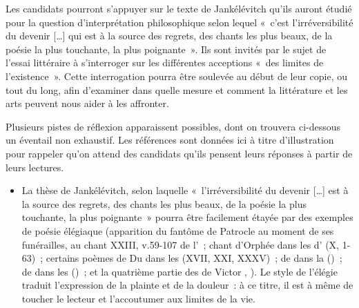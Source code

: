 		{Les candidats pourront s'appuyer sur le texte de Jankélévitch qu'ils auront étudié pour
la question d'interprétation philosophique selon lequel «~c'est l'irréversibilité du devenir
[…] qui est à la source des regrets, des chants les plus beaux, de la poésie la plus
touchante, la plus poignante~». Ils sont invités par le sujet de l'essai littéraire à
s'interroger sur les différentes acceptions «~des limites de l'existence~». Cette
interrogation pourra être soulevée au début de leur copie, ou tout du long, afin
d'examiner dans quelle mesure et comment la littérature et les arts peuvent nous aider
à les affronter.

Plusieurs pistes de réflexion apparaissent possibles, dont on trouvera ci-dessous un
éventail non exhaustif. Les références sont données ici à titre d'illustration pour
rappeler qu'on attend des candidats qu'ils pensent leurs réponses à partir de leurs
lectures.

\begin{itemize}
\item La thèse de Jankélévitch, selon laquelle «~l'irréversibilité du devenir […] est à la
source des regrets, des chants les plus beaux, de la poésie la plus touchante, la plus
poignante~» pourra être facilement étayée par des exemples de poésie élégiaque
(apparition du fantôme de Patrocle au moment de ses funérailles, au chant XXIII, v.59-107
de l'~; chant d'Orphée dans les  d' (X, 1-63)~; certains
poèmes de Du  dans les  (XVII, XXI, XXXV)~; de  dans la
 ()~; de
 dans les  ()~; et la quatrième partie des
 de 
Victor , 
). Le style de l'élégie traduit
l'expression de la plainte et de la douleur~: à ce titre, il est à même de toucher le lecteur
et l'accoutumer aux limites de la vie.


\end{itemize}}
